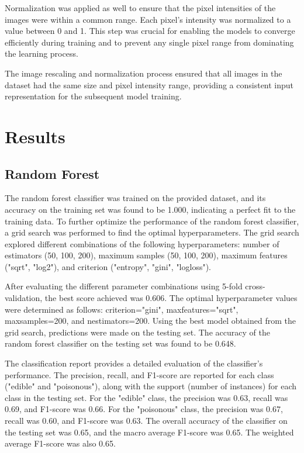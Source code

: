 \documentclass{article}
\begin{document}
Normalization was applied as well to ensure that the pixel intensities of the images were within a common range. Each pixel's intensity was normalized to a value between 0 and 1. This step was crucial for enabling the models to converge efficiently during training and to prevent any single pixel range from dominating the learning process.

The image rescaling and normalization process ensured that all images in the dataset had the same size and pixel intensity range, providing a consistent input representation for the subsequent model training.

\section{Results}
\subsection{Random Forest}
The random forest classifier was trained on the provided dataset, and its accuracy on the training set was found to be 1.000, indicating a perfect fit to the training data. To further optimize the performance of the random forest classifier, a grid search was performed to find the optimal hyperparameters. The grid search explored different combinations of the following hyperparameters: number of estimators (50, 100, 200), maximum samples (50, 100, 200), maximum features ("sqrt", "log2"), and criterion ("entropy", "gini", "log\textunderscore loss").

After evaluating the different parameter combinations using 5-fold cross-validation, the best score achieved was 0.606. The optimal hyperparameter values were determined as follows: criterion="gini", max\textunderscore features="sqrt", max\textunderscore samples=200, and n\textunderscore estimators=200. Using the best model obtained from the grid search, predictions were made on the testing set. The accuracy of the random forest classifier on the testing set was found to be 0.648.

The classification report provides a detailed evaluation of the classifier's performance. The precision, recall, and F1-score are reported for each class ("edible" and "poisonous"), along with the support (number of instances) for each class in the testing set. For the "edible" class, the precision was 0.63, recall was 0.69, and F1-score was 0.66. For the "poisonous" class, the precision was 0.67, recall was 0.60, and F1-score was 0.63. The overall accuracy of the classifier on the testing set was 0.65, and the macro average F1-score was 0.65. The weighted average F1-score was also 0.65.
\end{document}

